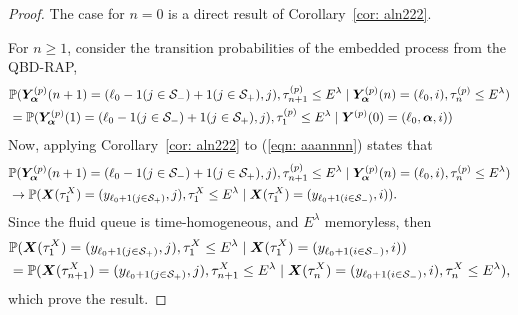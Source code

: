 \begin{proof}
The case for \(n=0\) is a direct result of Corollary~\ref{cor: aln222}. %

For \(n\geq 1\), consider the transition probabilities of the embedded process from the QBD-RAP, 
\begin{align}
	&\mathbb P(\bm{Y}_{\bm{\alpha}}^{(p)}(n+1) = (\ell_0-1(j\in\mathcal{S}_-)+1(j\in\mathcal{S}_+),j),\tau_{n+1}^{(p)}\leq E^\lambda
	\mid \bm{Y}_{\bm{\alpha}}^{(p)}(n) = (\ell_0,i),\tau_{n}^{(p)}\leq E^\lambda) \nonumber 
	\\&=\mathbb P(\bm{Y}_{\bm{\alpha}}^{(p)}(1) = (\ell_0-1(j\in\mathcal{S}_-)+1(j\in\mathcal{S}_+), j), \tau_{1}^{(p)}\leq E^\lambda
	\mid \boldsymbol Y^{(p)}(0)=(\ell_0 ,\boldsymbol\alpha, i)) \label{eqn: aaannnn}
\end{align}
Now, applying Corollary~\ref{cor: aln222} to (\ref{eqn: aaannnn}) states that 
\begin{align}
	&\mathbb P(\bm{Y}_{\bm{\alpha}}^{(p)}(n+1) = (\ell_0-1(j\in\mathcal{S}_-)+1(j\in\mathcal{S}_+),j),\tau_{n+1}^{(p)}\leq E^\lambda
	\mid \bm{Y}_{\bm{\alpha}}^{(p)}(n) = (\ell_0,i),\tau_{n}^{(p)}\leq E^\lambda) \nonumber 
	\\&\to \mathbb P(\boldsymbol X(\tau_{1}^X) = (y_{\ell_0+1(j\in\mathcal{S}_+)}, j), \tau_{1}^{X}\leq E^\lambda \mid \boldsymbol X(\tau_{1}^X) = (y_{\ell_0+1(i\in\mathcal{S}_-)},i)).\label{eqnL sdfdfaaa}
\end{align}
Since the fluid queue is time-homogeneous, and \(E^\lambda\) memoryless, then 
\begin{align}
	&\mathbb P(\boldsymbol X(\tau_{1}^X) = (y_{\ell_0+1(j\in\mathcal{S}_+)}, j), \tau_{1}^{X}\leq E^\lambda \mid \boldsymbol X(\tau_{1}^X) = (y_{\ell_0+1(i\in\mathcal{S}_-)},i))
	\\&=\mathbb P(\boldsymbol X(\tau_{n+1}^X) = (y_{\ell_0+1(j\in\mathcal{S}_+)}, j), \tau_{n+1}^{X}\leq E^\lambda \mid \boldsymbol X(\tau_{n}^X) = (y_{\ell_0+1(i\in\mathcal{S}_-)},i), \tau_{n}^{X}\leq E^\lambda ),
\end{align}
which prove the result. 
\end{proof}
